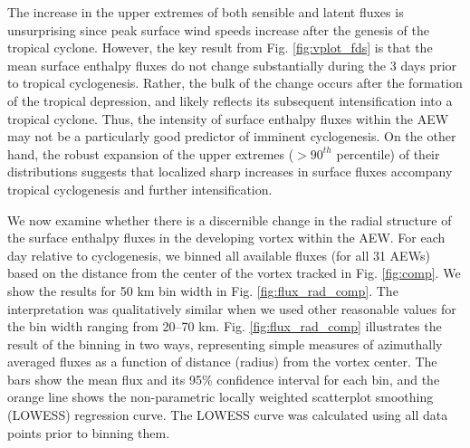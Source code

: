 \documentclass[draft]{agujournal2019}
\begin{document}
The increase in the upper extremes of both sensible and latent fluxes is unsurprising since peak surface wind speeds increase after the genesis of the tropical cyclone. However, the key result from Fig. \ref{fig:vplot_fds} is that the mean surface enthalpy fluxes do not change substantially during the 3 days prior to tropical cyclogenesis. Rather, the bulk of the change occurs after the formation of the tropical depression, and likely reflects its subsequent intensification into a tropical cyclone.  Thus, the intensity of surface enthalpy fluxes within the AEW may not be a particularly good predictor of imminent cyclogenesis. On the other hand, the robust expansion of the upper extremes ($>90^{th}$ percentile) of their distributions suggests that localized sharp increases in surface fluxes accompany tropical cyclogenesis and further intensification. 





We now examine whether there is a discernible change in the radial structure of the surface enthalpy fluxes in the developing vortex within the AEW. For each day relative to cyclogenesis, we binned all available fluxes (for all 31 AEWs) based on the distance from the center of the vortex tracked in Fig. \ref{fig:comp}. We show the results for 50 km bin width in Fig. \ref{fig:flux_rad_comp}. The interpretation was qualitatively similar when we used other reasonable values for the bin width ranging from 20--70 km. Fig. \ref{fig:flux_rad_comp} illustrates the result of the binning in two ways, representing simple measures of azimuthally averaged fluxes as a function of distance (radius) from the vortex center. The bars show the mean flux and its 95\% confidence interval for each bin, and the orange line shows the non-parametric locally weighted scatterplot smoothing (LOWESS) regression curve. The LOWESS curve was calculated using all data points prior to binning them.   
\end{document}
